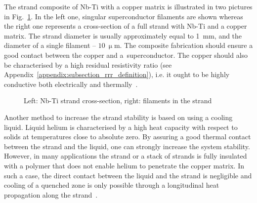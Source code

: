 The strand composite of Nb-Ti with a copper matrix is illustrated in two pictures in Fig.~\ref{fig:strand_and_filaments}. In the left one, singular superconductor filaments are shown whereas the right one represents a cross-section of a full strand with Nb-Ti and a copper matrix. The strand diameter is usually approximately equal to 1~mm, and the diameter of a single filament -- $10~\upmu$m.
The composite fabrication should ensure a good contact between the copper and a~superconductor. The copper should also be characterised by a high residual resistivity ratio (see Appendix~\ref{appendix:subsection_rrr_definition}), i.e. it ought to be highly conductive both electrically and thermally~\cite[p.~31-33]{superconducting_accelerator_magnets}.

\begin{figure}[H]
    \centering
    \caption{Left: Nb-Ti strand cross-section, right: filaments in the strand~\cite{lhc_machine_outreach}}
    \label{fig:strand_and_filaments}
\end{figure}

Another method to increase the strand stability is based on using a cooling liquid. Liquid helium is characterised by a high heat capacity with respect to solids at temperatures close to absolute zero. By assuring a good thermal contact between the strand and the liquid, one can strongly increase the system stability. However, in many applications the strand or a stack of strands is fully insulated with a polymer that does not enable helium to penetrate the copper matrix. In such a case, the direct contact between the liquid and the strand is negligible and cooling of a quenched zone is only possible through a longitudinal heat propagation along the strand~\cite[p.~122]{superconducting_accelerator_magnets}.

